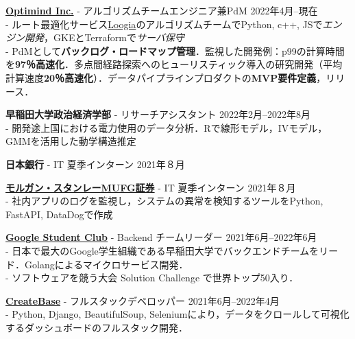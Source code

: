 \documentclass[uplatex,dvipdfmx,a4paper,11pt]{jsarticle}
\begin{document}
{\bf \href{https://www.optimind.tech/}{Optimind Inc.}} { - アルゴリズムチームエンジニア兼PdM} \hfill {2022年4月--現在} 
\\- ルート最適化サービス\href{https://loogia.jp/?_ga=2.72237267.1726635224.1669133714-1962149220.1665458028}{Loogia}のアルゴリズムチームでPython, c++, JSで\emph{エンジン開発}，GKEとTerraformで\emph{サーバ保守}
\\- PdMとして\textbf{バックログ・ロードマップ管理}．監視した開発例：p99の計算時間を\textbf{97％高速化}．多点間経路探索へのヒューリスティック導入の研究開発（平均計算速度\textbf{20％高速化}）．データパイプラインプロダクトの\textbf{MVP要件定義}，リリース．

{ \bf\textcolor{blue(pigment)}{早稲田大学政治経済学部}} { - リサーチアシスタント} \hfill {2022年2月--2022年8月} 
\\- 開発途上国における電力使用のデータ分析．Rで線形モデル，IVモデル，GMMを活用した動学構造推定

{\bf\textcolor{blue(pigment)}{日本銀行}}{ - IT 夏季インターン} \hfill { 2021年８月} 

{\bf \href{https://www.morganstanley.co.jp/ja}{モルガン・スタンレーMUFG証券}}{ - IT 夏季インターン} \hfill {2021年８月} 
\\- 社内アプリのログを監視し，システムの異常を検知するツールをPython, FastAPI, DataDogで作成

{ \bf\href{https://gdsc.community.dev/waseda-university/}{Google Student Club}} { - Backend チームリーダー} \hfill {2021年6月--2022年6月} 
\\- 日本で最大のGoogle学生組織である早稲田大学でバックエンドチームをリード．Golangによるマイクロサービス開発．
\\- ソフトウェアを競う大会 Solution Challenge で世界トップ50入り．

{\bf \href{https://createbase.work/}{CreateBase}} { - フルスタックデベロッパー} \hfill {2021年6月--2022年4月} 
\\- Python, Django, BeautifulSoup, Seleniumにより，データをクロールして可視化するダッシュボードのフルスタック開発．
\end{document}
